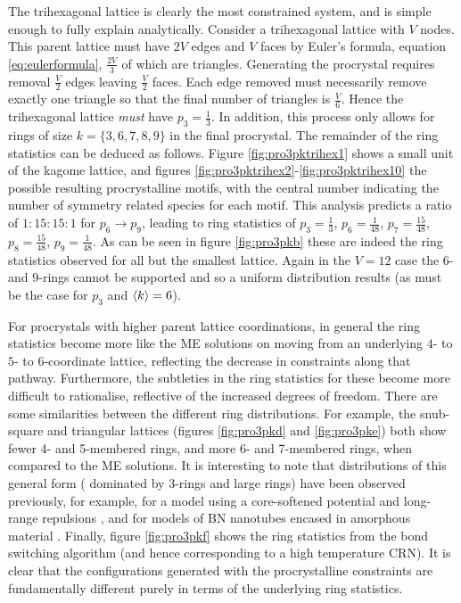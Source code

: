 The trihexagonal lattice is clearly the most constrained system, and is simple enough to fully explain analytically.
Consider a trihexagonal lattice with $V$ nodes. 
This parent lattice must have $2V$ edges and $V$ faces by Euler's formula, equation \eqref{eq:eulerformula}, $\frac{2V}{3}$ of which are triangles.
Generating the procrystal requires removal $\frac{V}{2}$ edges leaving $\frac{V}{2}$ faces.
Each edge removed must necessarily remove exactly one triangle so that the final number of triangles is $\frac{V}{6}$.
Hence the trihexagonal lattice \textit{must} have $p_3=\frac{1}{3}$.
In addition, this process only allows for rings of size $k=\{3,6,7,8,9\}$ in the final procrystal.
The remainder of the ring statistics can be deduced as follows.
Figure \ref{fig:pro3pktrihex1} shows a small unit of the kagome lattice, and figures \ref{fig:pro3pktrihex2}\--\ref{fig:pro3pktrihex10} the possible resulting procrystalline motifs, with the central number indicating the number of symmetry related species for each motif. 
This analysis predicts a ratio of $1:15:15:1$ for $p_6\rightarrow p_9$, leading to ring statistics of $p_3=\frac{1}{3}$, $p_6=\frac{1}{48}$, $p_7=\frac{15}{48}$, $p_8=\frac{15}{48}$, $p_9=\frac{1}{48}$.
As can be seen in figure \ref{fig:pro3pkb} these are indeed the ring statistics observed for all but the smallest lattice.
Again in the $V=12$ case the $6$\-- and $9$\--rings cannot be supported and so a uniform distribution results (as must be the case for $p_3$ and $\langle k \rangle=6$). 

For procrystals with higher parent lattice coordinations, in general the ring statistics become more like the ME solutions on moving from an underlying $4$\-- to $5$\-- to $6$\--coordinate lattice, reflecting the decrease in constraints along that pathway.
Furthermore, the subtleties in the ring statistics for these become more difficult to rationalise, reflective of the increased degrees of freedom.
There are some similarities between the different ring distributions.
For example, the snub\--square and triangular lattices (figures \ref{fig:pro3pkd} and \ref{fig:pro3pke}) both show
fewer 4\-- and 5\--membered rings, and more 6\-- and 7\--membered rings, when compared to the ME solutions.
It is interesting to note that distributions of this general form (\ie{} dominated by 3\--rings and large rings) have been observed previously, for example, for a model using a core-softened potential and long-range repulsions \cite{Camp2003}, and for models of BN nanotubes encased in amorphous material \cite{Griebel2007}.
Finally, figure \ref{fig:pro3pkf} shows the ring statistics from the bond switching algorithm (and hence corresponding to a high temperature CRN). 
It is clear that the configurations generated with the procrystalline constraints are fundamentally different purely in terms of the underlying ring statistics.

